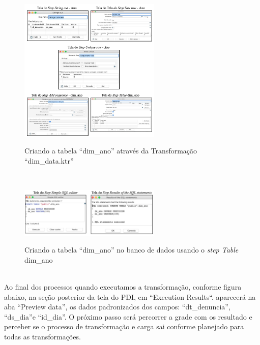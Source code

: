 \begin{figure}[H]
	\vspace*{0,2cm}
    \centering
    \caption{Criando a tabela ``dim\_ano'' atrav\'{e}s da Transforma\c{c}\~{a}o ``dim\_data.ktr''}
    \includegraphics[width=0.6\textwidth]{./04-figuras/figura-dim-ano}
    \label{fig:ilustfigdimano}
\end{figure}
\vspace*{-0,9cm}
{\raggedright {}} \\

\begin{figure}[H]
	\vspace*{0,2cm}
    \centering
    \caption{Criando a tabela ``dim\_ano'' no banco de dados usando o \textit{step Table} dim\_ano}
    \includegraphics[width=0.6\textwidth]{./04-figuras/figura-tb-dim-ano}
    \label{fig:ilustfigtbdimano}
\end{figure}
\vspace*{-0,9cm}
{\raggedright {}} \\

Ao final dos processos quando executamos a transforma\c{c}\~{a}o, conforme figura abaixo, na se\c{c}\~{a}o posterior da tela do PDI, 
em ``Execution Results``. aparecer\'{a} na aba ``Preview data'', os dados padronizados dos campos: 
``dt\_denuncia'', ``ds\_dia''e ``id\_dia''. O pr\'{o}ximo passo ser\'{a} percorrer a grade com os resultado e 
perceber se o processo de transforma\c{c}\~{a}o e carga sai conforme planejado para todas as transforma\c{c}\~{o}es. 

